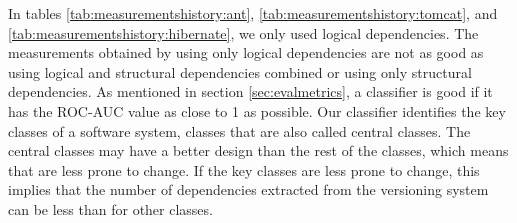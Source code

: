 \documentclass[12pt]{mitthesis}
\begin{document}
\begin{table}[!h]
\renewcommand{\arraystretch}{1}
\caption{Measurements for Hibernate using structural and logical dependencies combined}
\label{tab:measurementscombined:hibernate}
\centering
{}
\end{table}



In tables \ref{tab:measurementshistory:ant}, \ref{tab:measurementshistory:tomcat}, and \ref{tab:measurementshistory:hibernate}, we only used logical dependencies. The measurements obtained by using only logical dependencies are not as good as using logical and structural dependencies combined or using only structural dependencies.
As mentioned in section \ref{sec:evalmetrics}, a classifier is good if it has the ROC-AUC value as close to 1 as possible. Our classifier identifies the key classes of a software system, classes that are also called central classes. 
The central classes may have a better design than the rest of the classes, which means that are less prone to change. If the key classes are less prone to change, this implies that the number of dependencies extracted from the versioning system can be less than for other classes. 
\end{document}
